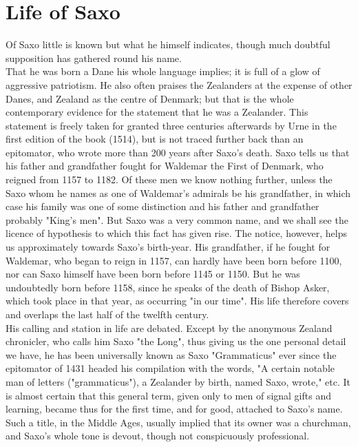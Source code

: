\documentclass[10pt,a4paper]{report}
\begin{document}
\chapter{Life of Saxo}
Of Saxo little is known but what he himself indicates, though much doubtful supposition has gathered round his name.\\

That he was born a Dane his whole language implies; it is full of a glow of aggressive patriotism. He also often praises the Zealanders at the expense of other Danes, and Zealand as the centre of Denmark; but that is the whole contemporary evidence for the statement that he was a Zealander. This statement is freely taken for granted three centuries afterwards by Urne in the first edition of the book (1514), but is not traced further back than an epitomator, who wrote more than 200 years after Saxo's death. Saxo tells us that his father and grandfather fought for Waldemar the First of Denmark, who reigned from 1157 to 1182. Of these men we know nothing further, unless the Saxo whom he names as one of Waldemar's admirals be his grandfather, in which case his family was one of some distinction and his father and grandfather probably "King's men". But Saxo was a very common name, and we shall see the licence of hypothesis to which this fact has given rise. The notice, however, helps us approximately towards Saxo's birth-year. His grandfather, if he fought for Waldemar, who began to reign in 1157, can hardly have been born before 1100, nor can Saxo himself have been born before 1145 or 1150. But he was undoubtedly born before 1158, since he speaks of the death of Bishop Asker, which took place in that year, as occurring "in our time". His life therefore covers and overlaps the last half of the twelfth century.\\

His calling and station in life are debated. Except by the anonymous Zealand chronicler, who calls him Saxo "the Long", thus giving us the one personal detail we have, he has been universally known as Saxo "Grammaticus" ever since the epitomator of 1431 headed his compilation with the words, "A certain notable man of letters ("grammaticus"), a Zealander by birth, named Saxo, wrote," etc. It is almost certain that this general term, given only to men of signal gifts and learning, became thus for the first time, and for good, attached to Saxo's name. Such a title, in the Middle Ages, usually implied that its owner was a churchman, and Saxo's whole tone is devout, though not conspicuously professional.\\
\end{document}

